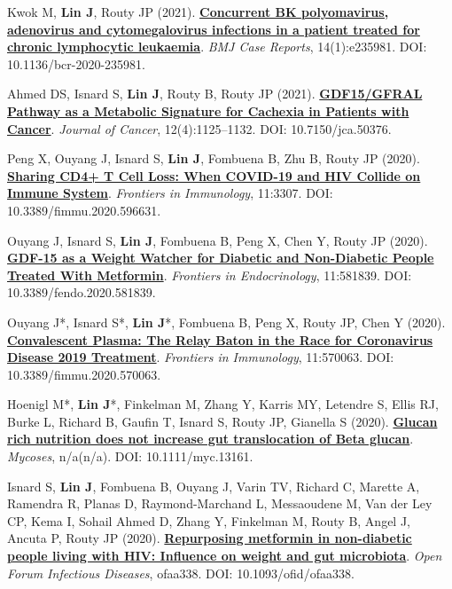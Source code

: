 \documentclass[letterpaper,11pt]{article}
\newcounter{journalCounter}
\newcommand{\jref}{%
    \stepcounter{journalCounter}%
    \textbf{[J.\thejournalCounter]}%
}
\begin{document}
\item[\jref] Kwok M, \textbf{Lin J}, Routy JP (2021). \href{https://doi.org/10.1136/bcr-2020-235981}{\textbf{Concurrent BK polyomavirus, adenovirus and cytomegalovirus infections in a patient treated for chronic lymphocytic leukaemia}}. \textit{BMJ Case Reports}, 14(1):e235981. DOI: 10.1136/bcr-2020-235981.

\item[\jref] Ahmed DS, Isnard S, \textbf{Lin J}, Routy B, Routy JP (2021). \href{https://doi.org/10.7150/jca.50376}{\textbf{GDF15/GFRAL Pathway as a Metabolic Signature for Cachexia in Patients with Cancer}}. \textit{Journal of Cancer}, 12(4):1125–1132. DOI: 10.7150/jca.50376.

\item[\jref] Peng X, Ouyang J, Isnard S, \textbf{Lin J}, Fombuena B, Zhu B, Routy JP (2020). \href{https://doi.org/10.3389/fimmu.2020.596631}{\textbf{Sharing CD4+ T Cell Loss: When COVID-19 and HIV Collide on Immune System}}. \textit{Frontiers in Immunology}, 11:3307. DOI: 10.3389/fimmu.2020.596631.

\item[\jref] Ouyang J, Isnard S, \textbf{Lin J}, Fombuena B, Peng X, Chen Y, Routy JP (2020). \href{https://doi.org/10.3389/fendo.2020.581839}{\textbf{GDF-15 as a Weight Watcher for Diabetic and Non-Diabetic People Treated With Metformin}}. \textit{Frontiers in Endocrinology}, 11:581839. DOI: 10.3389/fendo.2020.581839.

\item[\jref] Ouyang J*, Isnard S*, \textbf{Lin J}*, Fombuena B, Peng X, Routy JP, Chen Y (2020). \href{https://doi.org/10.3389/fimmu.2020.570063}{\textbf{Convalescent Plasma: The Relay Baton in the Race for Coronavirus Disease 2019 Treatment}}. \textit{Frontiers in Immunology}, 11:570063. DOI: 10.3389/fimmu.2020.570063.

\item[\jref] Hoenigl M*, \textbf{Lin J}*, Finkelman M, Zhang Y, Karris MY, Letendre S, Ellis RJ, Burke L, Richard B, Gaufin T, Isnard S, Routy JP, Gianella S (2020). \href{https://doi.org/10.1111/myc.13161}{\textbf{Glucan rich nutrition does not increase gut translocation of Beta glucan}}. \textit{Mycoses}, n/a(n/a). DOI: 10.1111/myc.13161.

\item[\jref] Isnard S, \textbf{Lin J}, Fombuena B, Ouyang J, Varin TV, Richard C, Marette A, Ramendra R, Planas D, Raymond-Marchand L, Messaoudene M, Van der Ley CP, Kema I, Sohail Ahmed D, Zhang Y, Finkelman M, Routy B, Angel J, Ancuta P, Routy JP (2020). \href{https://doi.org/10.1093/ofid/ofaa338}{\textbf{Repurposing metformin in non-diabetic people living with HIV: Influence on weight and gut microbiota}}. \textit{Open Forum Infectious Diseases}, ofaa338. DOI: 10.1093/ofid/ofaa338.
\end{document}

